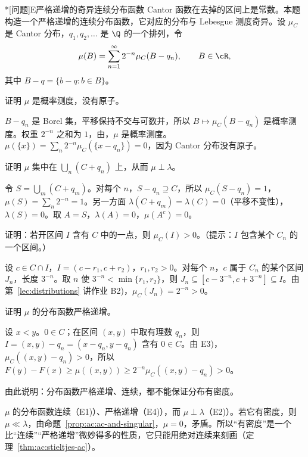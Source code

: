 \begin{probleme}*[问题]{E}{严格递增的奇异连续分布函数}
Cantor 函数在去掉的区间上是常数。本题构造一个严格递增的连续分布函数，它对应的分布与 Lebesgue 测度奇异。设 $\mu_C$ 是 Cantor 分布，$q_1,q_2,\dots$ 是 $\Q$ 的一个排列，令
\[
\mu(B)=\sum_{n=1}^\infty2^{-n}\mu_C(B-q_n),\qquad B\in\cR,
\]
其中 $B-q=\{b-q:b\in B\}$。
\begin{questions}
\item 证明 $\mu$ 是概率测度，没有原子。
\begin{solution}
$B-q_n$ 是 Borel 集，平移保持不交与可数并，所以 $B\mapsto\mu_C(B-q_n)$ 是概率测度。权重 $2^{-n}$ 之和为 $1$，由，$\mu$ 是概率测度。$\mu(\{x\})=\sum_n2^{-n}\mu_C(\{x-q_n\})=0$，因为 Cantor 分布没有原子。
\end{solution}
\item 证明 $\mu$ 集中在 $\bigcup_n(C+q_n)$ 上，从而 $\mu\perp\lambda$。
\begin{solution}
令 $S=\bigcup_m(C+q_m)$。对每个 $n$，$S-q_n\supseteq C$，所以 $\mu_C(S-q_n)=1$，$\mu(S)=\sum_n2^{-n}=1$。另一方面 $\lambda(C+q_m)=\lambda(C)=0$（平移不变性），$\lambda(S)=0$。取 $A=S$，$\lambda(A)=0$，$\mu(A^c)=0$。
\end{solution}
\item 证明：若开区间 $I$ 含有 $C$ 中的一点，则 $\mu_C(I)>0$。（提示：$I$ 包含某个 $C_n$ 的一个区间。）
\begin{solution}
设 $c\in C\cap I$，$I=(c-r_1,c+r_2)$，$r_1,r_2>0$。对每个 $n$，$c$ 属于 $C_n$ 的某个区间 $J_n$，长度 $3^{-n}$。取 $n$ 使 $3^{-n}<\min\{r_1,r_2\}$，则 $J_n\subseteq[c-3^{-n},c+3^{-n}]\subseteq I$。由第~\ref{lec:distributions} 讲作业 B2)，$\mu_C(J_n)=2^{-n}>0$。
\end{solution}
\item 证明 $\mu$ 的分布函数严格递增。
\begin{solution}
设 $x<y$。$0\in C$；在区间 $(x,y)$ 中取有理数 $q_n$，则 $I=(x,y)-q_n=(x-q_n,y-q_n)$ 含有 $0\in C$。由 E3)，$\mu_C((x,y)-q_n)>0$，所以 $F(y)-F(x)\geqslant\mu((x,y))\geqslant2^{-n}\mu_C((x,y)-q_n)>0$。
\end{solution}
\item 由此说明：分布函数严格递增、连续，都不能保证分布有密度。
\begin{solution}
$\mu$ 的分布函数连续（E1)）、严格递增（E4)），而 $\mu\perp\lambda$（E2)）。若它有密度，则 $\mu\ll\lambda$，由命题~\ref{prop:ac:ac-and-singular}，$\mu=0$，矛盾。所以“有密度”是一个比“连续”“严格递增”微妙得多的性质，它只能用绝对连续来刻画（定理~\ref{thm:ac:stieltjes-ac}）。
\end{solution}
\end{questions}
\end{probleme}

